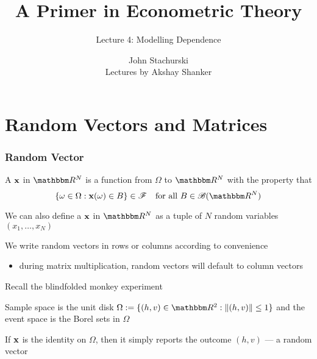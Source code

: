






\title{A Primer in Econometric Theory}

\subtitle
{Lecture 4: Modelling Dependence}

\author{John Stachurski \\ \tiny Lectures by Akshay Shanker}






\begin{frame}
  \titlepage
\end{frame}

\section{Random Vectors and Matrices}

\begin{frame}\frametitle{Random Vector}
    
    \vspace{2em}
    A  ${\mathbf x}$ in $\RR^N$ is
    a function from $\Omega$ to $\RR^N$ with the property that
    \begin{equation*}
        \label{eq:dorvv}
        \setntn{\omega \in \Omega}{\boldx(\omega) \in B} \in \fF
        \quad \text{for all } B \in \bB(\RR^N)
    \end{equation*}
    
    \vspace{1em}
    We can also define a  ${\mathbf x}$ in $\RR^N$ as
    a tuple of $N$ random variables $(x_1, \ldots, x_N)$
\end{frame}

\begin{frame}
    
    \vspace{2em}
    We write random vectors in rows or columns according to convenience
    
    \begin{itemize}
        \item during matrix multiplication, random
        vectors will default to column vectors
    \end{itemize}
    
    \vspace{1em}
    \Eg
    Recall the blindfolded monkey experiment
    
    Sample space is the unit disk $\Omega := \setntn{(h, v) \in \RR^2}{\| (h,
    v) \| \leq 1}$ and the event space is the Borel sets in $\Omega$
    
    If ${\mathbf x}$ is the identity on $\Omega$, then it simply reports the outcome
    $(h,v)$ --- a random vector
\end{frame}

